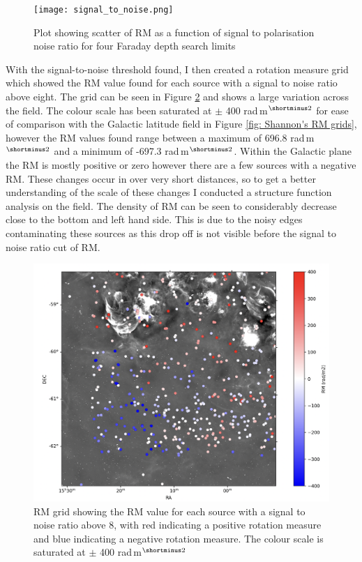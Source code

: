 \begin{figure}
    \centering
    \texttt{[image: signal\_to\_noise.png]}

        \caption{Plot showing scatter of RM as a function of signal to polarisation noise ratio for four Faraday depth search limits}
    \label{fig: s/n}
\end{figure}

With the signal-to-noise threshold found, I then created a rotation measure grid which showed the RM value found for each source with a signal to noise ratio above eight. The grid can be seen in Figure \ref{fig:1Grid} and shows a large variation across the field. The colour scale has been saturated at $\pm$ 400 rad$\,$m$^{\shortminus2}$ for ease of comparison with the Galactic latitude field in Figure \ref{fig: Shannon's RM grids}, however the RM values found range between a maximum of 696.8 rad$\,$m$^{\shortminus2}$ and a minimum of -697.3 rad$\,$m$^{\shortminus2}$. Within the Galactic plane the RM is mostly positive or zero however there are a few sources with a negative RM. These changes occur in over very short distances, so to get a better understanding of the scale of these changes I conducted a structure function analysis on the field. The density of RM can be seen to considerably decrease close to the bottom and left hand side. This is due to the noisy edges contaminating these sources as this drop off is not visible before the signal to noise ratio cut of RM.



\begin{figure}
    \centering
    \includegraphics[width=\linewidth]{Thesis_Template/Figures/rm_without_nebulae.png}

        \caption{RM grid showing the RM value for each source with a signal to noise ratio above 8, with red indicating a positive rotation measure and blue indicating a negative rotation measure. The colour scale is saturated at $\pm$ 400 rad$\,$m$^{\shortminus2}$}
    \label{fig:1Grid}
\end{figure}



